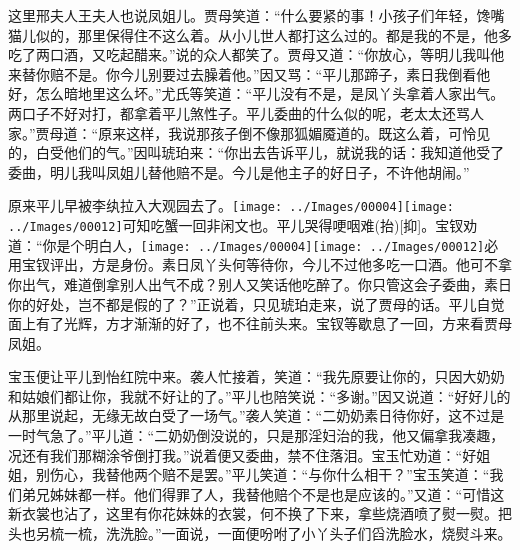 这里邢夫人王夫人也说凤姐儿。贾母笑道：``什么要紧的事！小孩子们年轻，馋嘴猫儿似的，那里保得住不这么着。从小儿世人都打这么过的。都是我的不是，他多吃了两口酒，又吃起醋来。''说的众人都笑了。贾母又道：``你放心，等明儿我叫他来替你赔不是。你今儿别要过去臊着他。''因又骂：``平儿那蹄子，素日我倒看他好，怎么暗地里这么坏。''尤氏等笑道：``平儿没有不是，是凤丫头拿着人家出气。两口子不好对打，都拿着平儿煞性子。平儿委曲的什么似的呢，老太太还骂人家。''贾母道：``原来这样，我说那孩子倒不像那狐媚魇道的。既这么着，可怜见的，白受他们的气。''因叫琥珀来：``你出去告诉平儿，就说我的话：我知道他受了委曲，明儿我叫凤姐儿替他赔不是。今儿是他主子的好日子，不许他胡闹。''

原来平儿早被李纨拉入大观园去了。{\texttt{[image: ../Images/00004]}\texttt{[image: ../Images/00012]}\footnotesize \kaishu 可知吃蟹一回非闲文也。}平儿哭得哽咽难{(抬)}{[}抑{]}。宝钗劝道：``你是个明白人，{\texttt{[image: ../Images/00004]}\texttt{[image: ../Images/00012]}\footnotesize \kaishu 必用宝钗评出，方是身份。}素日凤丫头何等待你，今儿不过他多吃一口酒。他可不拿你出气，难道倒拿别人出气不成？别人又笑话他吃醉了。你只管这会子委曲，素日你的好处，岂不都是假的了？''正说着，只见琥珀走来，说了贾母的话。平儿自觉面上有了光辉，方才渐渐的好了，也不往前头来。宝钗等歇息了一回，方来看贾母凤姐。

宝玉便让平儿到怡红院中来。袭人忙接着，笑道：``我先原要让你的，只因大奶奶和姑娘们都让你，我就不好让的了。''平儿也陪笑说：``多谢。''因又说道：``好好儿的从那里说起，无缘无故白受了一场气。''袭人笑道：``二奶奶素日待你好，这不过是一时气急了。''平儿道：``二奶奶倒没说的，只是那淫妇治的我，他又偏拿我凑趣，况还有我们那糊涂爷倒打我。''说着便又委曲，禁不住落泪。宝玉忙劝道：``好姐姐，别伤心，我替他两个赔不是罢。''平儿笑道：``与你什么相干？''宝玉笑道：``我们弟兄姊妹都一样。他们得罪了人，我替他赔个不是也是应该的。''又道：``可惜这新衣裳也沾了，这里有你花妹妹的衣裳，何不换了下来，拿些烧酒喷了熨一熨。把头也另梳一梳，洗洗脸。''一面说，一面便吩咐了小丫头子们舀洗脸水，烧熨斗来。

